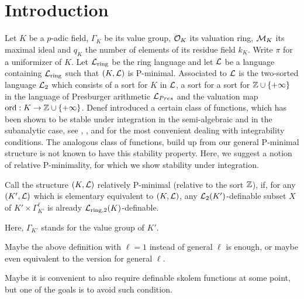 \section{Introduction}


Let $K$ be a $p$-adic field, $\Gamma_K$ be its value group, ${\mathcal O}_K$ its valuation ring, ${\mathcal M}_K$ its maximal ideal and $q_K$ the number of elements of its residue field $k_K$. Write $\pi$ for a uniformizer of $K$. Let ${\mathcal L}_{\rm ring}$ be the ring language and let ${\mathcal L}$ be a language containing ${\mathcal L}_{\rm ring}$ such that $(K,{\mathcal L})$ is P-minimal. Associated to ${\mathcal L}$ is the two-sorted language ${\mathcal L}_2$ which consists of a sort for $K$ in ${\mathcal L}$, a sort for a sort for ${\mathbb Z}\cup\{+\infty\}$ in the language of Presburger arithmetic ${\mathcal L}_{Pres}$ and the valuation map $\operatorname{ord}: K\to {\mathbb Z}\cup\{+\infty\}$. Denef introduced a certain class of functions, which has been shown to be stable under integration in the semi-algebraic and in the subanalytic case, see \cite{denef-2000}, \cite{Clu-2003}, and \cite{Clu-Gor-Hal-14} for the most convenient dealing with integrability conditions. The analogous class of functions, build up from our general P-minimal structure is not known to have this stability property. Here, we suggest a notion of relative P-minimality, for which we show stability under integration.

\begin{defn}

Call the structure $(K,{\mathcal L})$ relatively P-minimal (relative to the sort ${\mathbb Z}$), if, for any $(K',{\mathcal L})$ which is elementary equivalent to $(K,{\mathcal L})$, any ${\mathcal L}_2(K')$-definable subset $X$ of $K'\times \Gamma_{K'}^\ell$ is already ${\mathcal L}_{\rm ring, 2}(K)$-definable.

\end{defn}
Here, $\Gamma_{K'}$ stands for the value group of $K'$.

\begin{remark - ques}\label{rq1} Maybe the above definition with $\ell=1$ instead of general $\ell$ is enough, or maybe even equivalent to the version for general $\ell$. 
\end{remark - ques}


\begin{remark}\label{r1} Maybe it is convenient to also require definable skolem functions at some point, but one of the goals is to avoid such condition. 
\end{remark}


